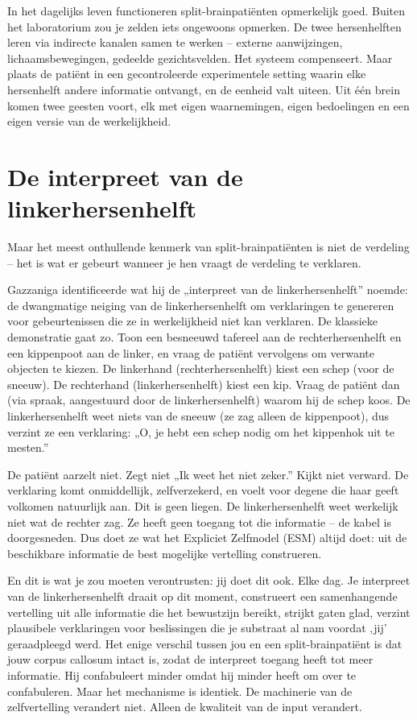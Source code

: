 \documentclass[11pt, twoside, openright]{book}
\begin{document}
In het dagelijks leven functioneren split-brainpatiënten opmerkelijk goed. Buiten het laboratorium zou je zelden iets ongewoons opmerken. De twee hersenhelften leren via indirecte kanalen samen te werken -- externe aanwijzingen, lichaamsbewegingen, gedeelde gezichtsvelden. Het systeem compenseert. Maar plaats de patiënt in een gecontroleerde experimentele setting waarin elke hersenhelft andere informatie ontvangt, en de eenheid valt uiteen. Uit één brein komen twee geesten voort, elk met eigen waarnemingen, eigen bedoelingen en een eigen versie van de werkelijkheid.

\section*{De interpreet van de linkerhersenhelft}

Maar het meest onthullende kenmerk van split-brainpatiënten is niet de verdeling -- het is wat er gebeurt wanneer je hen vraagt de verdeling te verklaren.

Gazzaniga identificeerde wat hij de „interpreet van de linkerhersenhelft” noemde: de dwangmatige neiging van de linkerhersenhelft om verklaringen te genereren voor gebeurtenissen die ze in werkelijkheid niet kan verklaren. De klassieke demonstratie gaat zo. Toon een besneeuwd tafereel aan de rechterhersenhelft en een kippenpoot aan de linker, en vraag de patiënt vervolgens om verwante objecten te kiezen. De linkerhand (rechterhersenhelft) kiest een schep (voor de sneeuw). De rechterhand (linkerhersenhelft) kiest een kip. Vraag de patiënt dan (via spraak, aangestuurd door de linkerhersenhelft) waarom hij de schep koos. De linkerhersenhelft weet niets van de sneeuw (ze zag alleen de kippenpoot), dus verzint ze een verklaring: „O, je hebt een schep nodig om het kippenhok uit te mesten.”

De patiënt aarzelt niet. Zegt niet „Ik weet het niet zeker.” Kijkt niet verward. De verklaring komt onmiddellijk, zelfverzekerd, en voelt voor degene die haar geeft volkomen natuurlijk aan. Dit is geen liegen. De linkerhersenhelft weet werkelijk niet wat de rechter zag. Ze heeft geen toegang tot die informatie -- de kabel is doorgesneden. Dus doet ze wat het Expliciet Zelfmodel (ESM) altijd doet: uit de beschikbare informatie de best mogelijke vertelling construeren.

En dit is wat je zou moeten verontrusten: jij doet dit ook. Elke dag. Je interpreet van de linkerhersenhelft draait op dit moment, construeert een samenhangende vertelling uit alle informatie die het bewustzijn bereikt, strijkt gaten glad, verzint plausibele verklaringen voor beslissingen die je substraat al nam voordat ‚jij' geraadpleegd werd. Het enige verschil tussen jou en een split-brainpatiënt is dat jouw corpus callosum intact is, zodat de interpreet toegang heeft tot meer informatie. Hij confabuleert minder omdat hij minder heeft om over te confabuleren. Maar het mechanisme is identiek. De machinerie van de zelfvertelling verandert niet. Alleen de kwaliteit van de input verandert.
\end{document}
